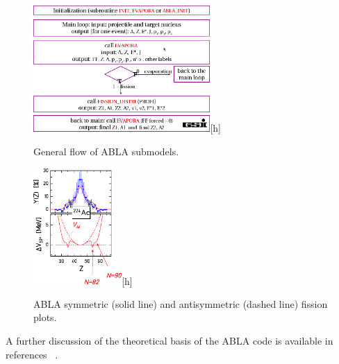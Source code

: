 \begin{figure}[h] 
\begin{center}
\includegraphics[width=0.6\textwidth]{images/AblaTable.png}[h]  
\caption{\label{fig:ablatable} General flow of ABLA submodels.}
 
 \end{center}
 \end{figure}
\begin{figure}[h] 
\begin{center}
\includegraphics[width=0.3\textwidth]{images/AblaHumps.png}[h]  
\caption{\label{fig:ablahumps} ABLA symmetric (solid line) and antisymmetric (dashed line) fission plots.}
 
 \end{center}
 \end{figure}

A further discussion of the theoretical basis of the ABLA code is available in references ~\cite{ablatalk,iia}.




  









